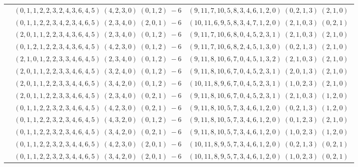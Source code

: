 \documentclass[11pt]{article}
\begin{document}
\begin{longtable}[l]{|c|c|c|}
 \cline{2-3} 
 & $(0 ,1 ,1 ,2 ,2 ,3 ,2 ,4 ,3 ,6 ,4 ,5) \;(4 ,2 ,3 ,0) \;(0 ,1 ,2) \;-6$ & $(9 ,11 ,7 ,10 ,5 ,8 ,3 ,4 ,6 ,1 ,2 ,0) \;(0 ,2 ,1 ,3) \;(2 ,1 ,0) \;$\\ 
 \cline{2-3} 
 & $(0 ,1 ,1 ,2 ,2 ,3 ,4 ,2 ,3 ,4 ,6 ,5) \;(2 ,3 ,4 ,0) \;(2 ,0 ,1) \;-6$ & $(10 ,11 ,6 ,9 ,5 ,8 ,3 ,4 ,7 ,1 ,2 ,0) \;(2 ,1 ,0 ,3) \;(0 ,2 ,1) \;$\\ 
 \cline{2-3} 
 & $(2 ,0 ,1 ,1 ,2 ,2 ,3 ,4 ,3 ,6 ,4 ,5) \;(2 ,3 ,4 ,0) \;(0 ,1 ,2) \;-6$ & $(9 ,11 ,7 ,10 ,6 ,8 ,0 ,4 ,5 ,2 ,3 ,1) \;(2 ,1 ,0 ,3) \;(2 ,1 ,0) \;$\\ 
 \cline{2-3} 
 & $(0 ,1 ,2 ,1 ,2 ,2 ,3 ,4 ,3 ,6 ,4 ,5) \;(4 ,2 ,3 ,0) \;(0 ,1 ,2) \;-6$ & $(9 ,11 ,7 ,10 ,6 ,8 ,2 ,4 ,5 ,1 ,3 ,0) \;(0 ,2 ,1 ,3) \;(2 ,1 ,0) \;$\\ 
 \cline{2-3} 
 & $(2 ,1 ,0 ,1 ,2 ,2 ,3 ,3 ,4 ,6 ,4 ,5) \;(2 ,3 ,4 ,0) \;(0 ,1 ,2) \;-6$ & $(9 ,11 ,8 ,10 ,6 ,7 ,0 ,4 ,5 ,1 ,3 ,2) \;(2 ,1 ,0 ,3) \;(2 ,1 ,0) \;$\\ 
 \cline{2-3} 
 & $(2 ,0 ,1 ,1 ,2 ,2 ,3 ,3 ,4 ,6 ,4 ,5) \;(3 ,2 ,4 ,0) \;(0 ,1 ,2) \;-6$ & $(9 ,11 ,8 ,10 ,6 ,7 ,0 ,4 ,5 ,2 ,3 ,1) \;(2 ,0 ,1 ,3) \;(2 ,1 ,0) \;$\\ 
 \cline{2-3} 
 & $(2 ,0 ,1 ,1 ,2 ,2 ,3 ,3 ,4 ,4 ,6 ,5) \;(3 ,4 ,2 ,0) \;(0 ,1 ,2) \;-6$ & $(10 ,11 ,8 ,9 ,6 ,7 ,0 ,4 ,5 ,2 ,3 ,1) \;(1 ,0 ,2 ,3) \;(2 ,1 ,0) \;$\\ 
 \cline{2-3} 
 & $(2 ,0 ,1 ,1 ,2 ,2 ,3 ,3 ,4 ,6 ,4 ,5) \;(2 ,3 ,4 ,0) \;(0 ,2 ,1) \;-6$ & $(9 ,11 ,8 ,10 ,6 ,7 ,0 ,4 ,5 ,2 ,3 ,1) \;(2 ,1 ,0 ,3) \;(1 ,2 ,0) \;$\\ 
 \cline{2-3} 
 & $(0 ,1 ,1 ,2 ,2 ,3 ,2 ,3 ,4 ,6 ,4 ,5) \;(4 ,2 ,3 ,0) \;(0 ,2 ,1) \;-6$ & $(9 ,11 ,8 ,10 ,5 ,7 ,3 ,4 ,6 ,1 ,2 ,0) \;(0 ,2 ,1 ,3) \;(1 ,2 ,0) \;$\\ 
 \cline{2-3} 
 & $(0 ,1 ,1 ,2 ,2 ,3 ,2 ,3 ,4 ,6 ,4 ,5) \;(4 ,3 ,2 ,0) \;(0 ,1 ,2) \;-6$ & $(9 ,11 ,8 ,10 ,5 ,7 ,3 ,4 ,6 ,1 ,2 ,0) \;(0 ,1 ,2 ,3) \;(2 ,1 ,0) \;$\\ 
 \cline{2-3} 
 & $(0 ,1 ,1 ,2 ,2 ,3 ,2 ,3 ,4 ,6 ,4 ,5) \;(3 ,4 ,2 ,0) \;(0 ,2 ,1) \;-6$ & $(9 ,11 ,8 ,10 ,5 ,7 ,3 ,4 ,6 ,1 ,2 ,0) \;(1 ,0 ,2 ,3) \;(1 ,2 ,0) \;$\\ 
 \cline{2-3} 
 & $(0 ,1 ,1 ,2 ,2 ,3 ,2 ,3 ,4 ,4 ,6 ,5) \;(4 ,2 ,3 ,0) \;(2 ,0 ,1) \;-6$ & $(10 ,11 ,8 ,9 ,5 ,7 ,3 ,4 ,6 ,1 ,2 ,0) \;(0 ,2 ,1 ,3) \;(0 ,2 ,1) \;$\\ 
 \cline{2-3} 
 & $(0 ,1 ,1 ,2 ,2 ,3 ,2 ,3 ,4 ,4 ,6 ,5) \;(3 ,4 ,2 ,0) \;(2 ,0 ,1) \;-6$ & $(10 ,11 ,8 ,9 ,5 ,7 ,3 ,4 ,6 ,1 ,2 ,0) \;(1 ,0 ,2 ,3) \;(0 ,2 ,1) \;$\\ 

\end{longtable}
\end{document}
